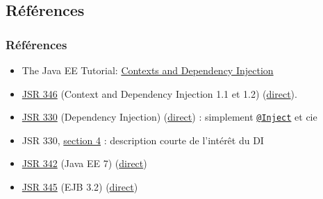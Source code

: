\documentclass[english, french]{beamer}
\begin{document}
\subsection{Références}
\begin{frame}
	\frametitle{Références}
	\begin{itemize}
		\item The Java EE Tutorial: \href{http://docs.oracle.com/javaee/7/tutorial/partcdi.htm}{Contexts and Dependency Injection}
		\item \href{https://jcp.org/en/jsr/detail?id=346}{JSR 346} (Context and Dependency Injection 1.1 et 1.2) (\href{http://download.oracle.com/otn-pub/jcp/cdi-1_2-mrel-eval-spec/cdi-1.2.pdf}{direct}).
		\item \href{https://jcp.org/en/jsr/detail?id=330}{JSR 330} (Dependency Injection) (\href{http://download.oracle.com/otn-pub/jcp/dependency_injection-1.0-final-oth-JSpec/dependency_injection-1_0-final-spec.zip}{direct}) : simplement \href{http://docs.oracle.com/javaee/7/api/javax/inject/Inject.html}{\texttt{@Inject}} et cie
		\item JSR 330, \href{https://jcp.org/en/jsr/detail?id=330\#4}{section 4} : description courte de l’intérêt du DI
		\item \href{https://jcp.org/en/jsr/detail?id=342}{JSR 342} (Java EE 7) (\href{http://download.oracle.com/otn-pub/jcp/java_ee-7-mrel-eval-spec/JavaEE_Platform_Spec.pdf}{direct})
		\item \href{https://jcp.org/en/jsr/detail?id=345}{JSR 345} (EJB 3.2) (\href{http://download.oracle.com/otn-pub/jcp/ejb-3_2-fr-eval-spec/ejb-3_2-core-fr-spec.pdf}{direct})
	\end{itemize}
\end{frame}
\end{document}
